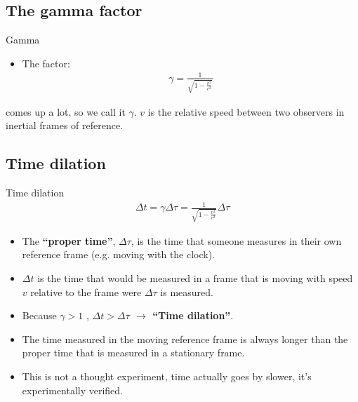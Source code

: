 \documentclass[aspectratio=169,
hyperref={colorlinks,urlcolor=blue}
]{beamer}
\begin{document}
\subsection{The gamma factor}
\label{subsec:thegammafactor}
\begin{frame}{Gamma}
\begin{itemize}
\item The factor:
\begin{align*}
\gamma = \frac{1}{\sqrt{1-\frac{v^2}{c^2}}}
\end{align*}
\end{itemize}
comes up a lot, so we call it $\gamma$. $v$ is the relative speed between two observers in inertial frames of reference. 
\end{frame}





\subsection{Time dilation}
\label{subsec:timedilation}
\begin{frame}{Time dilation}
\begin{align*}
\Delta t = \gamma \Delta \tau = \frac{1}{\sqrt{1-\frac{v^2}{c^2}}} \Delta\tau
\end{align*}
\begin{itemize}
\item The \textbf{``proper time''}, $\Delta\tau$, is the time that someone measures in their own reference frame (e.g. moving with the clock).
\item $\Delta t$ is the time that would be measured in a frame that is moving with speed $v$ relative to the frame were $\Delta\tau$ is measured.
\item Because $\gamma>1$ ,\textbf{ $\Delta t> \Delta \tau$ $\rightarrow$ ``Time dilation''}.
\item[$\rightarrow$] The time measured in the moving reference frame is always longer than the proper time that is measured in a stationary frame.
\item[$\rightarrow$]  This is not a thought experiment, time actually goes by slower, it's experimentally verified. 
\end{itemize}

\end{frame}




\end{document}
